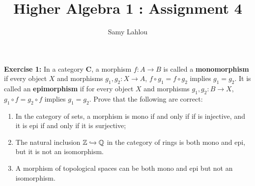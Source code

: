 \documentclass{article}
\title{Higher Algebra 1 : Assignment 4}
\author{Samy Lahlou}
\date{}
\newcommand{\Q}{\mathbb{Q}}
\newcommand{\Z}{\mathbb{Z}}
\newcommand{\CatC}{\textbf{C}}
\begin{document}
\maketitle

\noindent \textbf{Exercise 1:} In a category \CatC, a morphism $f : A \to B$ is called a \textbf{monomorphism} if every object $X$ and morphisms $g_1, g_2 : X \to A$, $f \circ g_1 = f \circ g_2$ implies $g_1 = g_2$. It is called an \textbf{epimorphism} if for every object $X$ and morphisms $g_1, g_2 : B \to X$, $g_1 \circ f = g_2 \circ f$ implies $g_1 = g_2$. Prove that the following are correct:
\begin{enumerate}[label=(\alph*)]
    \item In the category of sets, a morphism is mono if and only if if is injective, and it is epi if and only if it is surjective;
    \item The natural inclusion $\Z \xhookrightarrow{} \Q$ in the category of rings is both mono and epi, but it is not an isomorphism.
    \item A morphism of topological spaces can be both mono and epi but not an isomorphism.
\end{enumerate}
\end{document}
